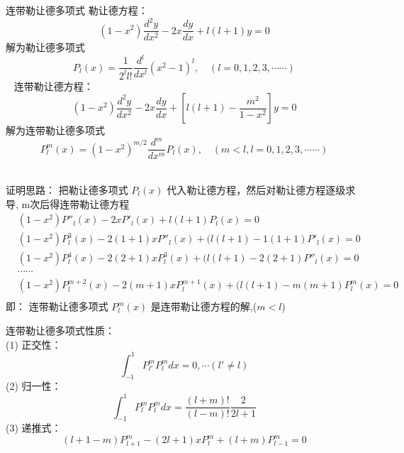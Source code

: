 	{连带勒让德多项式}
	勒让德方程：
	\begin{equation*}
		\left(1-x^{2}\right) \frac{d^{2} y}{d x^{2}}-2 x \frac{d y}{d x}+l(l+1)y=0
	\end{equation*}		
	解为勒让德多项式
	\begin{equation*}
		P_{l}(x)=\frac{1}{2^{l} l !} \frac{d^{l}}{d x^{l}}\left(x^{2}-1\right)^{l}, \quad(l=0,1,2,3, \cdots \cdots)
	\end{equation*}	 
	连带勒让德方程：
	\begin{equation*}
		\left(1-x^{2}\right) \frac{d^{2} y}{d x^{2}}-2 x \frac{d y}{d x}+\left[l(l+1)-\frac{m^{2}}{1-x^{2}}\right] y=0
	\end{equation*}		
	解为连带勒让德多项式
	\begin{equation*}
		P^m  _{l}(x)= (1-x^2) ^ {m/2 } \frac{d^{m}}{d x^{m} } P_l(x),  \quad(m < l, l=0,1,2,3, \cdots \cdots)
	\end{equation*}	 
	


	{证明思路：}
	把勒让德多项式 $P_{l}(x) $ 代入勒让德方程，然后对勒让德方程逐级求导, m次后得连带勒让德方程
	\begin{equation*}
		\begin{split}
			&\left(1-x^{2}\right) P'' _l  (x) -2 x P' _l (x)+l(l+1)P_l(x)=0	\\
			&\left(1-x^{2}\right) P^{3} _l  (x) -2(1+1) x P'' _l (x)+(l(l+1)-1(1+1)P'_l(x)=0	\\
			&\left(1-x^{2}\right) P^{4} _l  (x) -2(2+1) x P^{3} _l (x)+(l(l+1)-2(2+1)P''_l(x)=0	\\
			& \cdots \cdots\\
			&\left(1-x^{2}\right) P^{m+2} _l  (x) -2(m+1) x P^{m+1} _l (x)+(l(l+1)-m(m+1)P^{m} _l(x)=0	\\
		\end{split}
	\end{equation*}
	即： 连带勒让德多项式  $P^{m} _l  (x)  $ 是连带勒让德方程的解,($m < l$)
	


	连带勒让德多项式性质：\\
	(1) 正交性： 
	\begin{equation*}
		\int_{-1}^{1} P^m _{l'}P^m _{l} dx =0 ,\cdots (l'\ne l)
	\end{equation*}	
	(2) 归一性：
	\begin{equation*}
		\int_{-1}^{1} P^m _l P^m _l dx =  \frac{(l+m)!}{(l-m)!}\frac{2}{2l+1}
	\end{equation*}	
	(3) 递推式： 
	\begin{equation*}
		(l+1-m)P^m _{l+1} -(2l+1)x P^m _l + (l+m) P^m _{l-1} =0 
	\end{equation*}		
	


